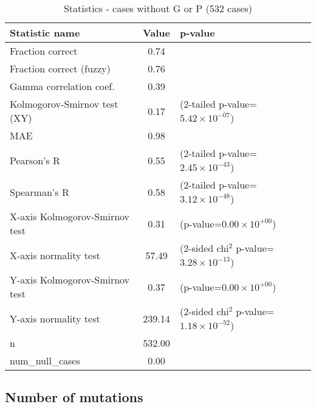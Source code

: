 \documentclass[10pt, letterpaper, oneside, titlepage, landscape]{scrreprt}
\begin{document}
\begin{table}[H]\begin{center}
\begin{tabular}{ l S[table-format=3.2] l}
Statistic name & {Value} & p-value\\
\hline
Fraction correct & 0.74 & \\
Fraction correct (fuzzy) & 0.76 & \\
Gamma correlation coef. & 0.39 & \\
Kolmogorov-Smirnov test (XY) & 0.17 & (2-tailed p-value=$5.42\times10^{-07}$)\\
MAE & 0.98 & \\
Pearson's R & 0.55 & (2-tailed p-value=$2.45\times10^{-43}$)\\
Spearman's R & 0.58 & (2-tailed p-value=$3.12\times10^{-48}$)\\
X-axis Kolmogorov-Smirnov test & 0.31 & (p-value=$0.00\times10^{+00}$)\\
X-axis normality test & 57.49 & (2-sided chi$^{2}$ p-value=$3.28\times10^{-13}$)\\
Y-axis Kolmogorov-Smirnov test & 0.37 & (p-value=$0.00\times10^{+00}$)\\
Y-axis normality test & 239.14 & (2-sided chi$^{2}$ p-value=$1.18\times10^{-52}$)\\
n & 532.00 & \\
num\_null\_cases & 0.00 & \\
\end{tabular}
\caption{Statistics - cases without G or P (532 cases)}
\end{center}\end{table}


\subsection{Number of mutations}
\end{document}

